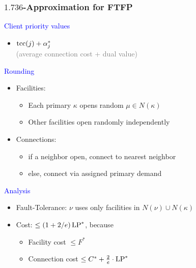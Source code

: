 \documentclass[hyperref,dvipsnames,svgnames,compress]{beamer}
\begin{document}

\begin{frame}
  \frametitle{$1.736$-Approximation for FTFP} 

{\large

\textcolor{blue}{Client priority values}	
	
	\begin{itemize}
		\item $\mbox{\rm{tcc}}(j) + \alpha_j^\ast$ 
			\\
				{\normalsize \textcolor{gray}{(average connection cost + dual value)}}
	\end{itemize}

\textcolor{blue}{Rounding}

  	\begin{itemize}
  	  	\item  \textcolor{Sepia}{Facilities:} 
			\begin{itemize}
				\item Each primary $\kappa$ opens random $\mu\in N(\kappa)$
				\item Other facilities open randomly independently
			\end{itemize}
	  	\item \textcolor{Sepia}{Connections:} 
	 		\begin{itemize}
					\item if a neighbor open, connect to nearest neighbor
					\item else, connect via assigned primary demand
			\end{itemize}
  	\end{itemize}

\textcolor{blue}{Analysis}

  \begin{itemize}
  	\item \textcolor{Sepia}{Fault-Tolerance:} $\nu$ uses only facilities in
    			$N(\nu) \cup N(\kappa)$
  	\item \textcolor{Sepia}{Cost:} $\le (1+2/e)\,\mbox{\rm LP}^\ast$, because
    	\begin{itemize}
    		\item Facility cost $\le F^\ast$
    		\item Connection cost $\le C^\ast + \frac{2}{e}\cdot \mbox{\rm LP}^\ast$
    	\end{itemize}
  \end{itemize}
}
\end{frame}
\end{document}
